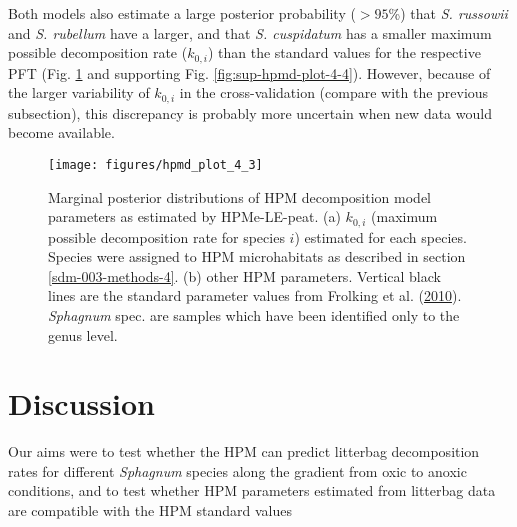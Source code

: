 \documentclass[
  12pt,
]{article}
\begin{document}
Both models also estimate a large posterior probability (\(>95\)\%) that \emph{S. russowii} and \emph{S. rubellum} have a larger, and that \emph{S. cuspidatum} has a smaller maximum possible decomposition rate (\(k_{0,i}\)) than the standard values for the respective PFT (Fig. \ref{fig:out-mm30-hpm-test-p2} and supporting Fig. \ref{fig:sup-hpmd-plot-4-4}). However, because of the larger variability of \(k_{0,i}\) in the cross-validation (compare with the previous subsection), this discrepancy is probably more uncertain when new data would become available.



\begin{figure}[H]

{\centering \texttt{[image: figures/hpmd\_plot\_4\_3]} 

}

\caption{Marginal posterior distributions of HPM decomposition model parameters as estimated by HPMe-LE-peat. (a) \(k_{0,i}\) (maximum possible decomposition rate for species \(i\)) estimated for each species. Species were assigned to HPM microhabitats as described in section \ref{sdm-003-methods-4}. (b) other HPM parameters. Vertical black lines are the standard parameter values from Frolking et al. (\protect\hyperlink{ref-Frolking.2010}{2010}). \emph{Sphagnum} spec. are samples which have been identified only to the genus level.}\label{fig:out-mm30-hpm-test-p2}
\end{figure}

\hypertarget{discussion}{%
\section{Discussion}\label{discussion}}

Our aims were to test whether the HPM can predict litterbag decomposition rates for different \emph{Sphagnum} species along the gradient from oxic to anoxic conditions, and to test whether HPM parameters estimated from litterbag data are compatible with the HPM standard values
\end{document}
